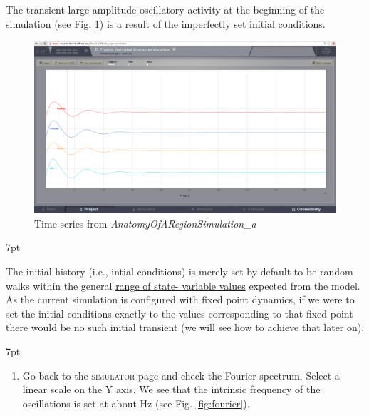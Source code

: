 \documentclass{tufte-handout}
\newenvironment{formal}{%
  \def\FrameCommand{%
    \hspace{1pt}%
    {\color{DarkBlue}\vrule width 2pt}%
    {\color{formalshade}\vrule width 4pt}%
    \colorbox{formalshade}%
  }%
  \MakeFramed{\advance\hsize-\width\FrameRestore}%
  \noindent\hspace{-4.55pt}%
  \begin{adjustwidth}{}{7pt}%
  \vspace{2pt}\vspace{2pt}%
}
{%
  \vspace{2pt}\end{adjustwidth}\endMakeFramed%
}
\newenvironment{blah}{%
  \def\FrameCommand{%
    \hspace{1pt}%
    {\color{DarkOrange}\vrule width 2pt}%
    {\color{PeachPuff}\vrule width 4pt}%
    \colorbox{PeachPuff}%
  }%
  \MakeFramed{\advance\hsize-\width\FrameRestore}%
  \noindent\hspace{-4.55pt}%
  \begin{adjustwidth}{}{7pt}%
  \vspace{2pt}\vspace{2pt}%
}
{%
  \vspace{2pt}\end{adjustwidth}\endMakeFramed%
}
\begin{document}
The transient large amplitude oscillatory activity at the beginning of the
simulation (see Fig. \ref{fig:time_series}) is a result of the imperfectly set initial conditions.

\begin{figure}[h]
  \includegraphics[width=\linewidth]{Handout_UI_BuildingYourOwnBrainNetworkModel_AnimatedTimeSeries}%
  \caption{Time-series from \textit{AnatomyOfARegionSimulation\_a}}%
  \label{fig:time_series}%
\end{figure}
 
\begin{blah}
The initial history (i.e., intial conditions) is
merely set by default to be random walks within the general \underline{range of state-
variable values} expected from the model. 
As the current simulation is
configured with fixed point dynamics, if we were to set the initial conditions
exactly to the values corresponding to that fixed point there would be no such
initial transient (we will see how to achieve that later on).
\end{blah}


\begin{formal}
\begin{enumerate}
\item Go back to the \textsc{simulator} page and check the Fourier spectrum. Select a linear scale on the Y axis. We see that the intrinsic frequency of the oscillations is set at about \unit[11]{Hz} (see Fig. \ref{fig:fourier}). 
\end{enumerate}
\end{formal}
\end{document}
